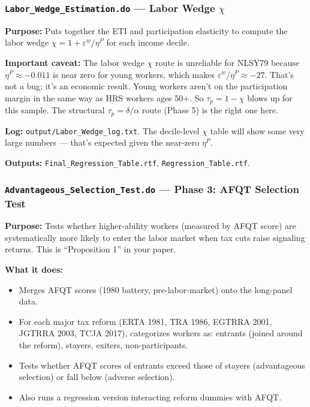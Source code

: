 \documentclass[11pt, letterpaper]{article}
\newcommand{\dofile}[1]{\texttt{#1}}
\newcommand{\logfile}[1]{\texttt{#1}}
\newcommand{\outputfile}[1]{\texttt{#1}}
\begin{document}
\vspace{6pt}
\subsubsection{\dofile{Labor\_Wedge\_Estimation.do} \textnormal{--- Labor Wedge $\chi$}}

\textbf{Purpose:} Puts together the ETI and participation elasticity to compute the labor wedge $\chi = 1 + \varepsilon^w/\eta^P$ for each income decile.

\textbf{Important caveat:} The labor wedge $\chi$ route is unreliable for NLSY79 because $\eta^P \approx -0.011$ is near zero for young workers, which makes $\varepsilon^w/\eta^P \approx -27$. That's not a bug; it's an economic result. Young workers aren't on the participation margin in the same way as HRS workers ages 50+. So $\tau_p = 1 - \chi$ blows up for this sample. The structural $\tau_p = \delta/\alpha$ route (Phase 5) is the right one here.

\textbf{Log:} \logfile{output/Labor\_Wedge\_log.txt}. The decile-level $\chi$ table will show some very large numbers --- that's expected given the near-zero $\eta^P$.

\textbf{Outputs:} \outputfile{Final\_Regression\_Table.rtf}, \outputfile{Regression\_Table.rtf}.

\vspace{6pt}
\subsubsection{\dofile{Advantageous\_Selection\_Test.do} \textnormal{--- Phase 3: AFQT Selection Test}}

\textbf{Purpose:} Tests whether higher-ability workers (measured by AFQT score) are systematically more likely to enter the labor market when tax cuts raise signaling returns. This is ``Proposition 1'' in your paper.

\textbf{What it does:}
\begin{itemize}
    \item Merges AFQT scores (1980 battery, pre-labor-market) onto the long-panel data.
    \item For each major tax reform (ERTA 1981, TRA 1986, EGTRRA 2001, JGTRRA 2003, TCJA 2017), categorizes workers as: entrants (joined around the reform), stayers, exiters, non-participants.
    \item Tests whether AFQT scores of entrants exceed those of stayers (advantageous selection) or fall below (adverse selection).
    \item Also runs a regression version interacting reform dummies with AFQT.
\end{itemize}
\end{document}
